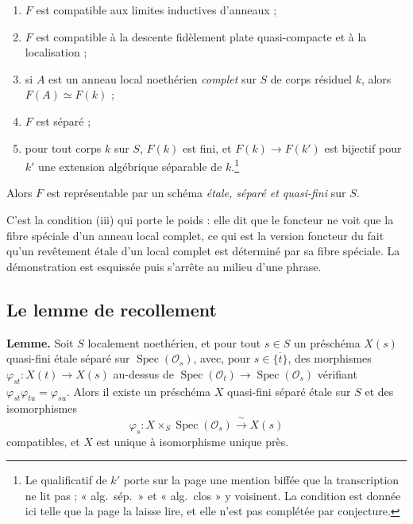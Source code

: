 \documentclass[11pt,a4paper]{article}
\begin{document}
\begin{enumerate}
  \item[(i)] $F$ est compatible aux limites inductives d'anneaux ;
  \item[(ii)] $F$ est compatible à la descente fidèlement plate quasi-compacte
    et à la localisation ;
  \item[(iii)] si $A$ est un anneau local noethérien \emph{complet} sur $S$ de
    corps résiduel $k$, alors $F(A) \simeq F(k)$ ;
  \item[(iv)] $F$ est séparé ;
  \item[(v)] pour tout corps $k$ sur $S$, $F(k)$ est fini, et
    $F(k) \to F(k')$ est bijectif pour $k'$ une extension algébrique séparable
    de $k$.\footnote{Le qualificatif de $k'$ porte sur la page une mention
    biffée que la transcription ne lit pas ; « alg.\ sép.\ » et « alg.\ clos »
    y voisinent. La condition est donnée ici telle que la page la laisse lire,
    et elle n'est pas complétée par conjecture.}
\end{enumerate}

Alors $F$ est représentable par un schéma \emph{étale, séparé et quasi-fini}
sur $S$.

C'est la condition (iii) qui porte le poids : elle dit que le foncteur ne voit
que la fibre spéciale d'un anneau local complet, ce qui est la version
foncteur du fait qu'un revêtement étale d'un local complet est déterminé par sa
fibre spéciale. La démonstration est esquissée puis s'arrête au milieu d'une
phrase.

\subsection*{Le lemme de recollement}

\textbf{Lemme.} Soit $S$ localement noethérien, et pour tout $s \in S$ un
préschéma $X(s)$ quasi-fini étale séparé sur
$\operatorname{Spec}(\mathcal{O}_{s})$, avec, pour $s \in \overline{\{t\}}$,
des morphismes $\varphi_{st} : X(t) \to X(s)$ au-dessus de
$\operatorname{Spec}(\mathcal{O}_{t}) \to \operatorname{Spec}(\mathcal{O}_{s})$
vérifiant $\varphi_{st}\varphi_{tu} = \varphi_{su}$. Alors il existe un
préschéma $X$ quasi-fini séparé étale sur $S$ et des isomorphismes
\[
  \varphi_{s} : X \times_{S} \operatorname{Spec}(\mathcal{O}_{s})
  \xrightarrow{\ \sim\ } X(s)
\]
compatibles, et $X$ est unique à isomorphisme unique près.

\end{document}
